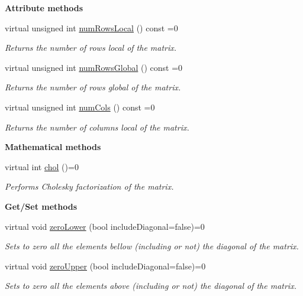\begin{Indent}{\bf Attribute methods}\par
\begin{DoxyCompactItemize}
\item 
virtual unsigned int \hyperlink{class_q_u_e_s_o_1_1_matrix_ac5b08947e3a1830180ab32739f236d0c}{num\-Rows\-Local} () const =0
\begin{DoxyCompactList}\small\item\em Returns the number of rows local of the matrix. \end{DoxyCompactList}\item 
virtual unsigned int \hyperlink{class_q_u_e_s_o_1_1_matrix_acda1fae13ff41264a11510f633d972be}{num\-Rows\-Global} () const =0
\begin{DoxyCompactList}\small\item\em Returns the number of rows global of the matrix. \end{DoxyCompactList}\item 
virtual unsigned int \hyperlink{class_q_u_e_s_o_1_1_matrix_ae3fadd056ae487979e8748844269497b}{num\-Cols} () const =0
\begin{DoxyCompactList}\small\item\em Returns the number of columns local of the matrix. \end{DoxyCompactList}\end{DoxyCompactItemize}
\end{Indent}
\begin{Indent}{\bf Mathematical methods}\par
\begin{DoxyCompactItemize}
\item 
virtual int \hyperlink{class_q_u_e_s_o_1_1_matrix_a23f2bee051f28ed10bf9b0b72d701f2e}{chol} ()=0
\begin{DoxyCompactList}\small\item\em Performs Cholesky factorization of the matrix. \end{DoxyCompactList}\end{DoxyCompactItemize}
\end{Indent}
\begin{Indent}{\bf Get/\-Set methods}\par
\begin{DoxyCompactItemize}
\item 
virtual void \hyperlink{class_q_u_e_s_o_1_1_matrix_a11cb54db37379985df41e44e410e857f}{zero\-Lower} (bool include\-Diagonal=false)=0
\begin{DoxyCompactList}\small\item\em Sets to zero all the elements bellow (including or not) the diagonal of the matrix. \end{DoxyCompactList}\item 
virtual void \hyperlink{class_q_u_e_s_o_1_1_matrix_a0c2624bc26684a9a119252fcc0401871}{zero\-Upper} (bool include\-Diagonal=false)=0
\begin{DoxyCompactList}\small\item\em Sets to zero all the elements above (including or not) the diagonal of the matrix. \end{DoxyCompactList}\end{DoxyCompactItemize}
\end{Indent}
